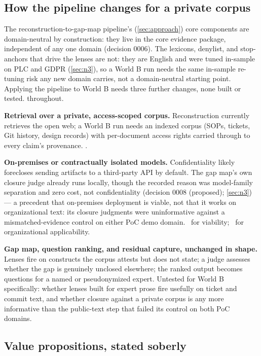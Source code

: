 \subsection{How the pipeline changes for a private corpus}
\label{sec:org-pipeline}

The reconstruction-to-gap-map pipeline's (\cref{sec:approach}) core components are domain-neutral
by construction: they live in the core evidence package, independent of any one domain (decision
0006). The lexicons, denylist, and stop-anchors that drive the lenses are not: they are English and
were tuned in-sample on PLC and GDPR (\cref{sec:n3}), so a World B run needs the same in-sample
re-tuning risk any new domain carries, not a domain-neutral starting point. Applying the pipeline to
World B needs three further changes, none built or tested. \evfut{} throughout.

\textbf{Retrieval over a private, access-scoped corpus.} Reconstruction currently retrieves the open
web; a World B run needs an indexed corpus (SOPs, tickets, Git history, design records) with
per-document access rights carried through to every claim's provenance. \evhyp.

\textbf{On-premises or contractually isolated models.} Confidentiality likely forecloses sending
artifacts to a third-party API by default. The gap map's own closure judge already runs locally,
though the recorded reason was model-family separation and zero cost, not confidentiality (decision
0008 (proposed); \cref{sec:n3}) --- a precedent that on-premises deployment is viable, not that it
works on organizational text: its closure judgments were uninformative against a mismatched-evidence control on
either PoC demo domain. \evobs\ for viability; \evint\ for organizational applicability.

\textbf{Gap map, question ranking, and residual capture, unchanged in shape.} Lenses fire on
constructs the corpus attests but does not state; a judge assesses whether the gap is genuinely
unclosed elsewhere; the ranked output becomes questions for a named or pseudonymized expert.
Untested for World B specifically: whether lenses built for expert prose fire usefully on ticket
and commit text, and whether closure against a private corpus is any more informative than the
public-text step that failed its control on both PoC domains.

\subsection{Value propositions, stated soberly}
\label{sec:org-value}

